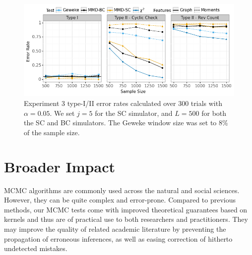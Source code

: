 \documentclass{article}
\begin{document}
\begin{figure}
    \centering
    \includegraphics[width=\textwidth]{figures/results_3.png}
    \caption{Experiment 3 type-I/II error rates calculated over 300 trials with $\alpha=0.05$. We set $j=5$ for the SC simulator, and $L=500$ for both the SC and BC simulators. The Geweke window size was set to $8\%$ of the sample size.
    }
    \label{fig:ex3_comparison}
\end{figure}


\section{Broader Impact}
MCMC algorithms are commonly used across the natural and social sciences. However, they can be quite complex and error-prone. Compared to previous methods, our MCMC tests come with improved theoretical guarantees based on kernels and thus are of practical use to both researchers and practitioners. They may improve the quality of related academic literature by preventing the propagation of erroneous inferences, as well as easing correction of hitherto undetected mistakes.


\end{document}

